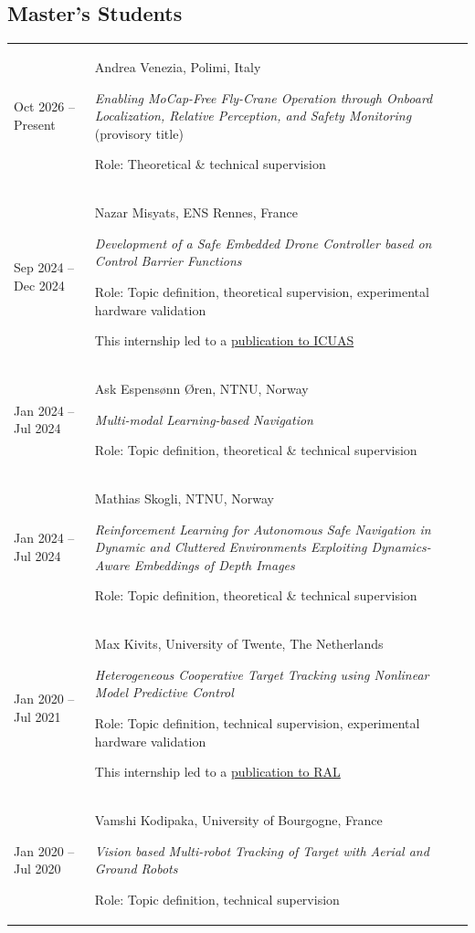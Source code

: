 \documentclass[11pt,a4paper]{article}
\newlength{\colone}
\newlength{\coltwo}
\begin{document}
\subsection{Master's Students}
\begin{longtable}{@{}p{\colone}p{\coltwo}@{}}
	Oct 2026 -- Present
		& {Andrea Venezia, Polimi, Italy  \par
		\small\emph{Enabling MoCap-Free Fly-Crane Operation through Onboard Localization, Relative Perception, and Safety Monitoring} (provisory title) \par
        Role: Theoretical \& technical supervision}
\\
	Sep 2024 -- Dec 2024
		& {Nazar Misyats, ENS Rennes, France  \par
		\small\emph{Development of a Safe Embedded Drone Controller based on Control Barrier Functions} \par
        Role: Topic definition, theoretical supervision, experimental hardware validation \par
		This internship led to a \href{https://doi.org/10.1109/IROS47612.2022.9981643}{publication to ICUAS}}
\\
	Jan 2024 -- Jul 2024
		& {Ask Espensønn Øren, NTNU, Norway \par
		\small\emph{Multi-modal Learning-based Navigation} \par
        Role: Topic definition, theoretical \& technical supervision}
\\
	Jan 2024 -- Jul 2024
		& {Mathias Skogli, NTNU, Norway \par
		\small\emph{Reinforcement Learning for Autonomous Safe Navigation in Dynamic and Cluttered Environments Exploiting Dynamics-Aware Embeddings of Depth Images} \par
        Role: Topic definition, theoretical \& technical supervision}
\\
	Jan 2020 -- Jul 2021
		& {Max Kivits, University of Twente, The Netherlands \par
		\small\emph{Heterogeneous Cooperative Target Tracking using Nonlinear Model Predictive Control} \par
        Role: Topic definition, technical supervision, experimental hardware validation \par
		This internship led to a \href{https://doi.org/10.1109/LRA.2022.3143218}{publication to RAL}}
\\
	Jan 2020 -- Jul 2020
		& {Vamshi Kodipaka, University of Bourgogne, France \par
		\small\emph{Vision based Multi-robot Tracking of Target with Aerial and Ground Robots} \par
        Role: Topic definition, technical supervision}
\end{longtable}
\end{document}
